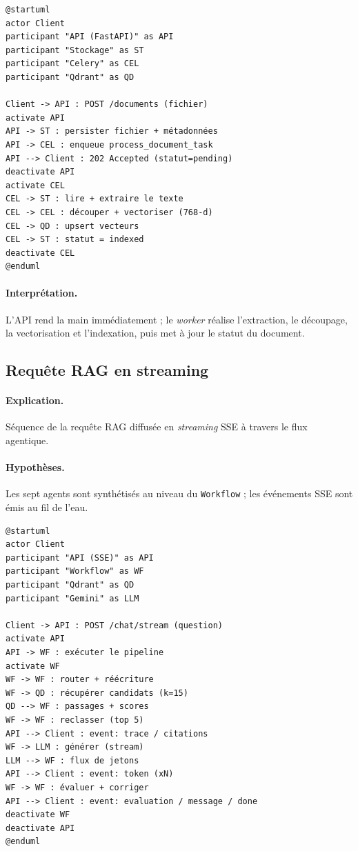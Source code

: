 \begin{lstlisting}[style=plantuml,caption={Séquence — ingestion documentaire},label={lst:seq-ingest}]
@startuml
actor Client
participant "API (FastAPI)" as API
participant "Stockage" as ST
participant "Celery" as CEL
participant "Qdrant" as QD

Client -> API : POST /documents (fichier)
activate API
API -> ST : persister fichier + métadonnées
API -> CEL : enqueue process_document_task
API --> Client : 202 Accepted (statut=pending)
deactivate API
activate CEL
CEL -> ST : lire + extraire le texte
CEL -> CEL : découper + vectoriser (768-d)
CEL -> QD : upsert vecteurs
CEL -> ST : statut = indexed
deactivate CEL
@enduml
\end{lstlisting}

\paragraph{Interprétation.} L'API rend la main immédiatement ; le \emph{worker}
réalise l'extraction, le découpage, la vectorisation et l'indexation, puis met à
jour le statut du document.

\subsection{Requête RAG en streaming}
\paragraph{Explication.} Séquence de la requête RAG diffusée en \emph{streaming}
SSE à travers le flux agentique.
\paragraph{Hypothèses.} Les sept agents sont synthétisés au niveau du
\texttt{Workflow} ; les événements SSE sont émis au fil de l'eau.

\begin{lstlisting}[style=plantuml,caption={Séquence — requête RAG en streaming},label={lst:seq-rag}]
@startuml
actor Client
participant "API (SSE)" as API
participant "Workflow" as WF
participant "Qdrant" as QD
participant "Gemini" as LLM

Client -> API : POST /chat/stream (question)
activate API
API -> WF : exécuter le pipeline
activate WF
WF -> WF : router + réécriture
WF -> QD : récupérer candidats (k=15)
QD --> WF : passages + scores
WF -> WF : reclasser (top 5)
API --> Client : event: trace / citations
WF -> LLM : générer (stream)
LLM --> WF : flux de jetons
API --> Client : event: token (xN)
WF -> WF : évaluer + corriger
API --> Client : event: evaluation / message / done
deactivate WF
deactivate API
@enduml
\end{lstlisting}

